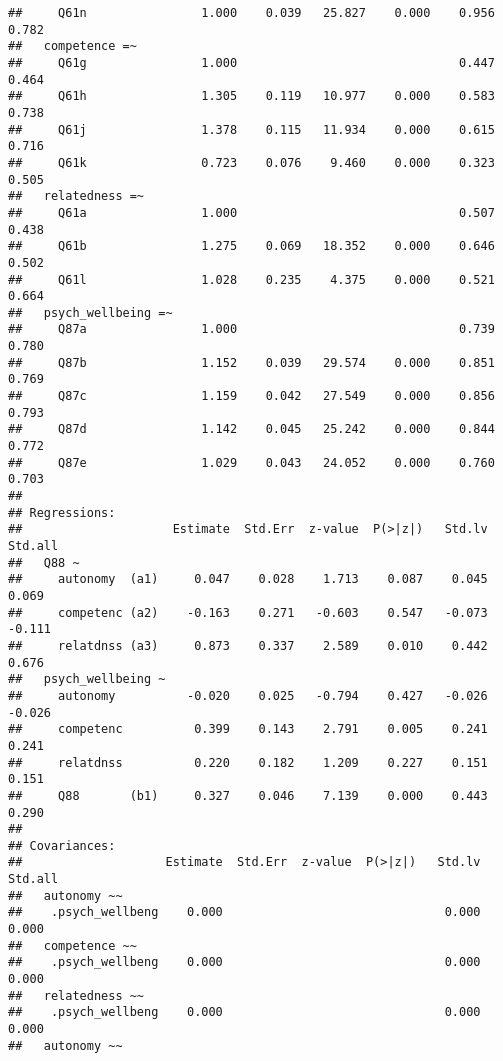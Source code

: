 \documentclass[
]{article}
\begin{document}
\begin{verbatim}
##     Q61n                1.000    0.039   25.827    0.000    0.956    0.782
##   competence =~                                                           
##     Q61g                1.000                               0.447    0.464
##     Q61h                1.305    0.119   10.977    0.000    0.583    0.738
##     Q61j                1.378    0.115   11.934    0.000    0.615    0.716
##     Q61k                0.723    0.076    9.460    0.000    0.323    0.505
##   relatedness =~                                                          
##     Q61a                1.000                               0.507    0.438
##     Q61b                1.275    0.069   18.352    0.000    0.646    0.502
##     Q61l                1.028    0.235    4.375    0.000    0.521    0.664
##   psych_wellbeing =~                                                      
##     Q87a                1.000                               0.739    0.780
##     Q87b                1.152    0.039   29.574    0.000    0.851    0.769
##     Q87c                1.159    0.042   27.549    0.000    0.856    0.793
##     Q87d                1.142    0.045   25.242    0.000    0.844    0.772
##     Q87e                1.029    0.043   24.052    0.000    0.760    0.703
## 
## Regressions:
##                     Estimate  Std.Err  z-value  P(>|z|)   Std.lv  Std.all
##   Q88 ~                                                                  
##     autonomy  (a1)     0.047    0.028    1.713    0.087    0.045    0.069
##     competenc (a2)    -0.163    0.271   -0.603    0.547   -0.073   -0.111
##     relatdnss (a3)     0.873    0.337    2.589    0.010    0.442    0.676
##   psych_wellbeing ~                                                      
##     autonomy          -0.020    0.025   -0.794    0.427   -0.026   -0.026
##     competenc          0.399    0.143    2.791    0.005    0.241    0.241
##     relatdnss          0.220    0.182    1.209    0.227    0.151    0.151
##     Q88       (b1)     0.327    0.046    7.139    0.000    0.443    0.290
## 
## Covariances:
##                    Estimate  Std.Err  z-value  P(>|z|)   Std.lv  Std.all
##   autonomy ~~                                                           
##    .psych_wellbeng    0.000                               0.000    0.000
##   competence ~~                                                         
##    .psych_wellbeng    0.000                               0.000    0.000
##   relatedness ~~                                                        
##    .psych_wellbeng    0.000                               0.000    0.000
##   autonomy ~~                                                           

\end{verbatim}
\end{document}
